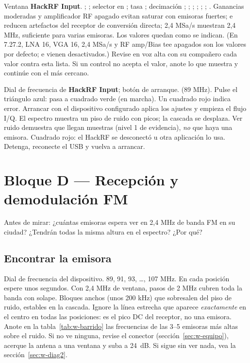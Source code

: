 {Ventana \textbf{HackRF Input}.}
{ ;  ; selector en ; tasa ; decimación ;  ;  ;  ;  ;  ;  .}
{Ganancias moderadas y amplificador RF apagado evitan saturar con emisoras fuertes;  e  reducen artefactos del receptor de conversión directa; 2,4 MSa/s muestran 2,4 MHz, suficiente para varias emisoras.}
{Los valores quedan como se indican. (En 7.27.2, LNA 16, VGA 16, 2,4 MSa/s y RF amp/Bias tee apagados son los valores por defecto;  e  vienen desactivados.)}
{Revise en voz alta con su compañero cada valor contra esta lista.}
{Si un control no acepta el valor, anote lo que muestra y continúe con el más cercano.}

{Dial de frecuencia de \textbf{HackRF Input}; botón de arranque.}
{ (89 MHz). Pulse el triángulo azul: pasa a cuadrado verde (en marcha). Un cuadrado rojo indica error.}
{Arrancar con el dispositivo configurado aplica los ajustes y empieza el flujo I/Q.}
{El espectro muestra un piso de ruido con picos; la cascada se desplaza.}
{Ver ruido demuestra que llegan muestras (nivel 1 de evidencia), \emph{no} que haya una emisora.}
{Cuadrado rojo: el HackRF se desconectó u otra aplicación lo usa. Detenga, reconecte el USB y vuelva a arrancar.}

\section{Bloque D --- Recepción y demodulación FM}
\label{sec:w-fm}

\begin{prediccion}
Antes de mirar: ¿cuántas emisoras espera ver en 2,4 MHz de banda FM en su ciudad? ¿Tendrán todas la misma altura en el espectro? ¿Por qué?
\end{prediccion}

\subsection{Encontrar la emisora}

{Dial de frecuencia del dispositivo.}
{89, 91, 93, \ldots, 107 MHz. En cada posición espere unos segundos.}
{Con 2,4 MHz de ventana, pasos de 2 MHz cubren toda la banda con solape.}
{Bloques anchos (unos 200 kHz) que sobresalen del piso de ruido, estables en la cascada. Ignore la línea estrecha que aparece \emph{exactamente} en el centro en todas las posiciones: es el pico DC del receptor, no una emisora.}
{Anote en la tabla~\ref{tab:w-barrido} las frecuencias de las 3--5 emisoras más altas sobre el ruido.}
{Si no ve ninguna, revise el conector (sección~\ref{sec:w-equipo}), acerque la antena a una ventana y suba  a 24~dB. Si sigue sin ver nada, vea la sección~\ref{sec:w-diag2}.}

